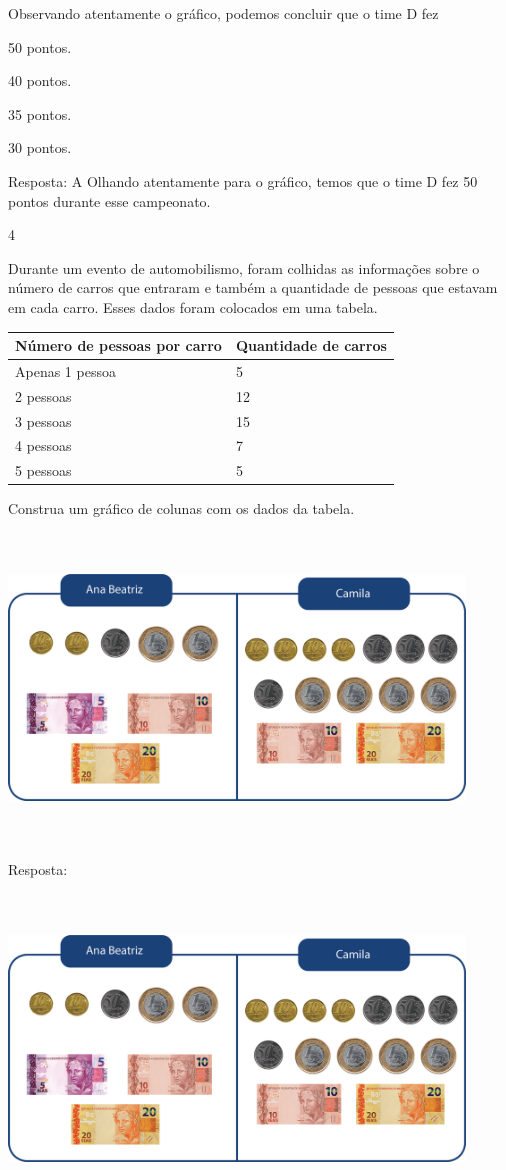 {\begin{escolha}
{Observando atentamente o gráfico, podemos concluir que o time D fez

\begin{escolha}
\item
  50 pontos.
\item
  40 pontos.
\item
  35 pontos.
\item
  30 pontos.
\end{escolha}

Resposta: A
Olhando atentamente para o gráfico, temos que o time D fez 50 pontos
durante esse campeonato.

\num{4}

Durante um evento de automobilismo, foram colhidas as informações sobre o número de carros
que entraram e também a quantidade de pessoas que estavam em cada carro.
Esses dados foram colocados em uma tabela.

\begin{longtable}[]{@{}ll@{}}
\toprule
Número de pessoas por carro & Quantidade de carros\tabularnewline
\midrule
\endhead
Apenas 1 pessoa & 5\tabularnewline
2 pessoas & 12\tabularnewline
3 pessoas & 15\tabularnewline
4 pessoas & 7\tabularnewline
5 pessoas & 5\tabularnewline
\bottomrule
\end{longtable}

Construa um gráfico de colunas com os dados da tabela.


\includegraphics[width=4.76708in,height=3.21695in]{media/image95.png}

Resposta:

\includegraphics[width=4.76708in,height=3.21695in]{media/image95.png}

}
\end{escolha}}
